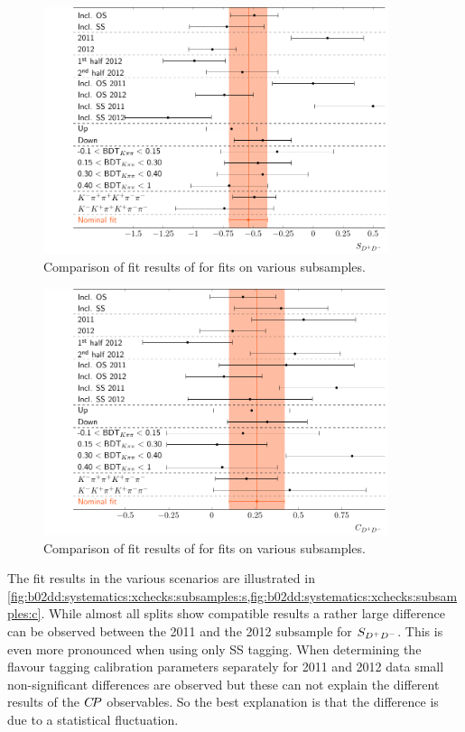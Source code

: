 \begin{figure}[thb]
\centering
\includegraphics[width=0.9\textwidth]{07-B02DD/tikz/pdf/SComparison.pdf}
\caption{
Comparison of fit results of \SDD for fits on various subsamples.}
\label{fig:b02dd:systematics:xchecks:subsamples:s}
\end{figure}
\begin{figure}[thb]
\centering
\includegraphics[width=0.9\textwidth]{07-B02DD/tikz/pdf/CComparison.pdf}
\caption{
Comparison of fit results of \CDD for fits on various subsamples.}
\label{fig:b02dd:systematics:xchecks:subsamples:c}
\end{figure}
The fit results in the various scenarios are illustrated in
\cref{fig:b02dd:systematics:xchecks:subsamples:s,fig:b02dd:systematics:xchecks:subsamples:c}.
While almost all splits show compatible results a rather large difference can
be observed between the 2011 and the 2012 subsample for $S_{{{D}^+}{{D}^-}}$. This is even
more pronounced when using only SS tagging. When determining the flavour
tagging calibration parameters separately for 2011 and 2012 data small
non-significant differences are observed but these can not explain the
different results of the ${C\!P}$ observables. So the best explanation is that
the difference is due to a statistical fluctuation.


